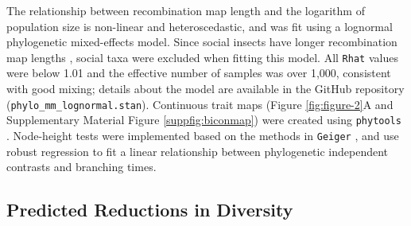 \documentclass[11pt]{article}
\begin{document}
The relationship between recombination map length and the logarithm of
population size is non-linear and heteroscedastic, and was fit using a
lognormal phylogenetic mixed-effects model. Since social insects have longer
recombination map lengths \parencite{Wilfert2007-dx}, social taxa were excluded
when fitting this model.  All \texttt{Rhat} \parencite{Vehtari2019-po} values
were below 1.01 and the effective number of samples was over 1,000, consistent
with good mixing; details about the model are available in the GitHub
repository (\texttt{phylo\_mm\_lognormal.stan}). Continuous trait maps (Figure
\ref{fig:figure-2}A and Supplementary Material Figure \ref{suppfig:biconmap})
were created using \texttt{phytools} \parencite{Revell2012-zq}. Node-height
tests were implemented based on the methods in \texttt{Geiger}
\parencite{Pennell2014-nx,Harmon2008-tr}, and use robust regression to fit a
linear relationship between phylogenetic independent contrasts and branching
times.

\subsection*{Predicted Reductions in Diversity}
\label{sec:methods-reduction}
\end{document}
